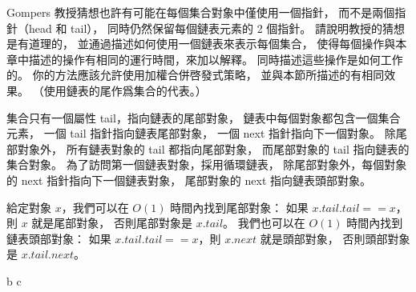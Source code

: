 \startEXERCISE
Gompers 教授猜想也許有可能在每個集合對象中僅使用一個指針，
而不是兩個指針（head 和 tail），
同時仍然保留每個鏈表元素的 2 個指針。
請說明教授的猜想是有道理的，
並通過描述如何使用一個鏈表來表示每個集合，
使得每個操作與本章中描述的操作有相同的運行時間，來加以解釋。
同時描述這些操作是如何工作的。
你的方法應該允許使用加權合併啓發式策略，
並與本節所描述的有相同效果。
（\hint 使用鏈表的尾作爲集合的代表。）
\stopEXERCISE

\startANSWER
集合只有一個屬性 tail，指向鏈表的尾部對象，
鏈表中每個對象都包含一個集合元素，
一個 tail 指針指向鏈表尾部對象，
一個 next 指針指向下一個對象。
除尾部對象外， 所有鏈表對象的 tail 都指向尾部對象，
而尾部對象的 tail 指向鏈表的集合對象。
為了訪問第一個鏈表對象，採用循環鏈表，
除尾部對象外，每個對象的 next 指針指向下一個鏈表對象，
尾部對象的 next 指向鏈表頭部對象。

給定對象 $x$，我們可以在 $O(1)$ 時間內找到尾部對象：
如果 $x.tail.tail == x$，則 $x$ 就是尾部對象，
否則尾部對象是 $x.tail$。
我們也可以在 $O(1)$ 時間內找到鏈表頭部對象：
如果 $x.tail.tail == x$，則 $x.next$ 就是頭部對象，
否則頭部對象是 $x.tail.next$。

{\externalfigure[e19_2-5-2]}{b}
{\externalfigure[e19_2-5-3]}{c}
{}{}
\stopcombination
\stopANSWER